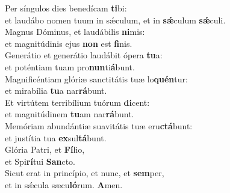 \evenverse Per síngulos dies benedícam \textbf{ti}bi:~\*\\
\evenverse et laudábo nomen tuum in sǽculum, et in \textbf{sǽ}culum \textbf{sǽ}culi.\\
\oddverse Magnus Dóminus, et laudábilis \textbf{ni}mis:~\*\\
\oddverse et magnitúdinis ejus \textbf{non} est \textbf{fi}nis.\\
\evenverse Generátio et generátio laudábit ópera \textbf{tu}a:~\*\\
\evenverse et poténtiam tuam pro\textbf{nun}ti\textbf{á}bunt.\\
\oddverse Magnificéntiam glóriæ sanctitátis tuæ lo\textbf{quén}tur:~\*\\
\oddverse et mirabília \textbf{tu}a nar\textbf{rá}bunt.\\
\evenverse Et virtútem terribílium tuórum \textbf{di}cent:~\*\\
\evenverse et magnitúdinem \textbf{tu}am nar\textbf{rá}bunt.\\
\oddverse Memóriam abundántiæ suavitátis tuæ eru\textbf{ctá}bunt:~\*\\
\oddverse et justítia tua \textbf{ex}sul\textbf{tá}bunt.\\
\evenverse Glória Patri, et \textbf{Fí}lio,~\*\\
\evenverse et Spi\textbf{rí}tui \textbf{San}cto.\\
\oddverse Sicut erat in princípio, et nunc, et \textbf{sem}per,~\*\\
\oddverse et in sǽcula sæcu\textbf{ló}rum. \textbf{A}men.\\

